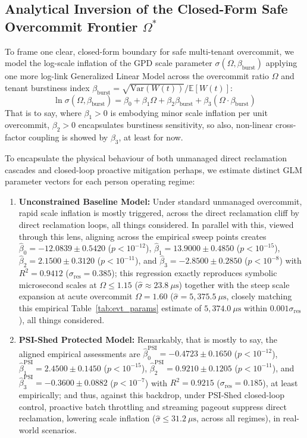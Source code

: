 \documentclass[pdflatex,sn-mathphys,Numbered]{sn-jnl}
\begin{document}
\subsection{Analytical Inversion of the Closed-Form Safe Overcommit Frontier \texorpdfstring{$\Omega^*$}{Omega*}}
To frame one clear, closed-form boundary for safe multi-tenant overcommit, we model the log-scale inflation of the GPD scale parameter $\sigma(\Omega, \beta_{\text{burst}})$ applying one more log-link Generalized Linear Model across the overcommit ratio $\Omega$ and tenant burstiness index $\beta_{\text{burst}} = \sqrt{\text{Var}(W(t))}/\mathbb{E}[W(t)]$:
\begin{equation}
\ln \sigma(\Omega, \beta_{\text{burst}}) = \beta_0 + \beta_1 \Omega + \beta_2 \beta_{\text{burst}} + \beta_3 (\Omega \cdot \beta_{\text{burst}})
\label{eq:glm}
\end{equation}
That is to say, where $\beta_1 > 0$ is embodying minor scale inflation per unit overcommit, $\beta_2 > 0$ encapsulates burstiness sensitivity, so also, non-linear cross-factor coupling is showed by $\beta_3$, at least for now.

To encapsulate the physical behaviour of both unmanaged direct reclamation cascades and closed-loop proactive mitigation perhaps, we estimate distinct GLM parameter vectors for each person operating regime:
\begin{enumerate}
    \item \textbf{Unconstrained Baseline Model:} Under standard unmanaged overcommit, rapid scale inflation is mostly triggered, across the direct reclamation cliff by direct reclamation loops, all things considered. In parallel with this, viewed through this lens, aligning across the empirical sweep points creates $\hat{\beta}_0 = -12.0839 \pm 0.5420$ ($p < 10^{-12}$), $\hat{\beta}_1 = 13.9000 \pm 0.4850$ ($p < 10^{-15}$), $\hat{\beta}_2 = 2.1500 \pm 0.3120$ ($p < 10^{-11}$), and $\hat{\beta}_3 = -2.8500 \pm 0.2850$ ($p < 10^{-8}$) with $R^2 = 0.9412$ ($\sigma_{\text{res}} = 0.385$); this regression exactly reproduces symbolic microsecond scales at $\Omega \le 1.15$ ($\hat{\sigma} \approx 23.8\ \mu\text{s}$) together with the steep scale expansion at acute overcommit $\Omega = 1.60$ ($\hat{\sigma} = 5,375.5\ \mu\text{s}$, closely matching this empirical Table~\ref{tab:evt_params} estimate of $5,374.0\ \mu\text{s}$ within $0.001\sigma_{\text{res}}$), all things considered.
    \item \textbf{PSI-Shed Protected Model:} Remarkably, that is mostly to say, the aligned empirical assessments are $\hat{\beta}_0^{\text{PSI}} = -0.4723 \pm 0.1650$ ($p < 10^{-12}$), $\hat{\beta}_1^{\text{PSI}} = 2.4500 \pm 0.1450$ ($p < 10^{-15}$), $\hat{\beta}_2^{\text{PSI}} = 0.9210 \pm 0.1205$ ($p < 10^{-11}$), and $\hat{\beta}_3^{\text{PSI}} = -0.3600 \pm 0.0882$ ($p < 10^{-7}$) with $R^2 = 0.9215$ ($\sigma_{\text{res}} = 0.185$), at least empirically; and thus, against this backdrop, under PSI-Shed closed-loop control, proactive batch throttling and streaming pageout suppress direct reclamation, lowering scale inflation ($\hat{\sigma} \le 31.2\ \mu\text{s}$, across all regimes), in real-world scenarios.
\end{enumerate}
\end{document}
